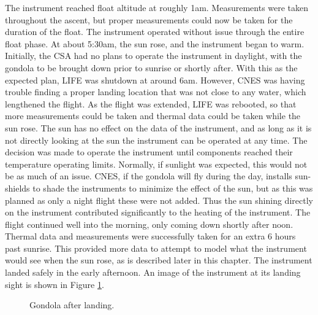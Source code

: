 The instrument reached float altitude at roughly 1am. Measurements were taken throughout the ascent, but proper measurements could now be taken for the duration of the float. The instrument operated without issue through the entire float phase. At about 5:30am, the sun rose, and the instrument began to warm. Initially, the CSA had no plans to operate the instrument in daylight, with the gondola to be brought down prior to sunrise or shortly after. With this as the expected plan, LIFE was shutdown at around 6am. However, CNES was having trouble finding a proper landing location that was not close to any water, which lengthened the flight. As the flight was extended, LIFE was rebooted, so that more measurements could be taken and thermal data could be taken while the sun rose. The sun has no effect on the data of the instrument, and as long as it is not directly looking at the sun the instrument can be operated at any time. The decision was made to operate the instrument until components reached their temperature operating limits. Normally, if sunlight was expected, this would not be as much of an issue. CNES, if the gondola will fly during the day, installs sun-shields to shade the instruments to minimize the effect of the sun, but as this was planned as only a night flight these were not added. Thus the sun shining directly on the instrument contributed significantly to the heating of the instrument. The flight continued well into the morning, only coming down shortly after noon. Thermal data and measurements were successfully taken for an extra 6 hours past sunrise. This provided more data to attempt to model what the instrument would see when the sun rose, as is described later in this chapter. The instrument landed safely in the early afternoon. An image of the instrument at its landing sight is shown in Figure \ref{fig:gondola_after_landing}. 

\begin{figure}
    \centering
    \caption{Gondola after landing.}
    \label{fig:gondola_after_landing}
\end{figure}

